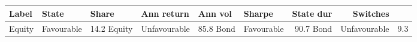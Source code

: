 \begin{tabular}{llllllrr}
\toprule
Label & State & Share & Ann return & Ann vol & Sharpe & State dur & Switches \\
\midrule
Equity & Favourable & 14.2%
Equity & Unfavourable & 85.8%
Bond & Favourable & 90.7%
Bond & Unfavourable & 9.3%
\bottomrule
\end{tabular}
